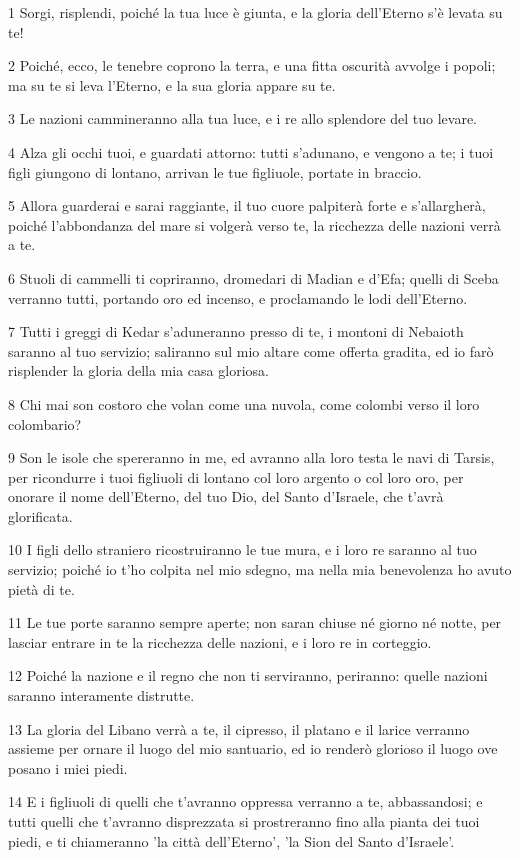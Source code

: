 \par 1 Sorgi, risplendi, poiché la tua luce è giunta, e la gloria dell'Eterno s'è levata su te!
\par 2 Poiché, ecco, le tenebre coprono la terra, e una fitta oscurità avvolge i popoli; ma su te si leva l'Eterno, e la sua gloria appare su te.
\par 3 Le nazioni cammineranno alla tua luce, e i re allo splendore del tuo levare.
\par 4 Alza gli occhi tuoi, e guardati attorno: tutti s'adunano, e vengono a te; i tuoi figli giungono di lontano, arrivan le tue figliuole, portate in braccio.
\par 5 Allora guarderai e sarai raggiante, il tuo cuore palpiterà forte e s'allargherà, poiché l'abbondanza del mare si volgerà verso te, la ricchezza delle nazioni verrà a te.
\par 6 Stuoli di cammelli ti copriranno, dromedari di Madian e d'Efa; quelli di Sceba verranno tutti, portando oro ed incenso, e proclamando le lodi dell'Eterno.
\par 7 Tutti i greggi di Kedar s'aduneranno presso di te, i montoni di Nebaioth saranno al tuo servizio; saliranno sul mio altare come offerta gradita, ed io farò risplender la gloria della mia casa gloriosa.
\par 8 Chi mai son costoro che volan come una nuvola, come colombi verso il loro colombario?
\par 9 Son le isole che spereranno in me, ed avranno alla loro testa le navi di Tarsis, per ricondurre i tuoi figliuoli di lontano col loro argento o col loro oro, per onorare il nome dell'Eterno, del tuo Dio, del Santo d'Israele, che t'avrà glorificata.
\par 10 I figli dello straniero ricostruiranno le tue mura, e i loro re saranno al tuo servizio; poiché io t'ho colpita nel mio sdegno, ma nella mia benevolenza ho avuto pietà di te.
\par 11 Le tue porte saranno sempre aperte; non saran chiuse né giorno né notte, per lasciar entrare in te la ricchezza delle nazioni, e i loro re in corteggio.
\par 12 Poiché la nazione e il regno che non ti serviranno, periranno: quelle nazioni saranno interamente distrutte.
\par 13 La gloria del Libano verrà a te, il cipresso, il platano e il larice verranno assieme per ornare il luogo del mio santuario, ed io renderò glorioso il luogo ove posano i miei piedi.
\par 14 E i figliuoli di quelli che t'avranno oppressa verranno a te, abbassandosi; e tutti quelli che t'avranno disprezzata si prostreranno fino alla pianta dei tuoi piedi, e ti chiameranno 'la città dell'Eterno', 'la Sion del Santo d'Israele'.
